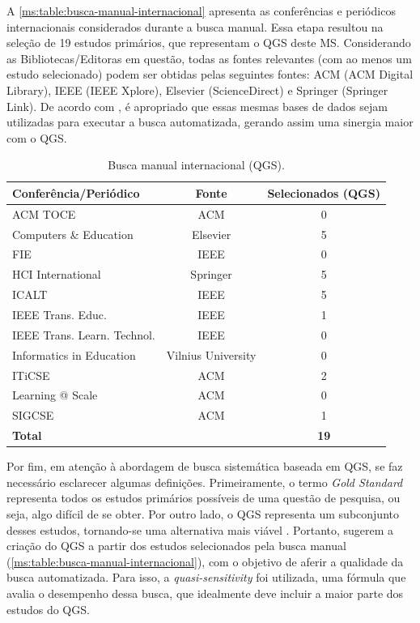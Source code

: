 A \autoref{ms:table:busca-manual-internacional} apresenta as conferências e periódicos internacionais considerados durante a busca manual. Essa etapa resultou na seleção de 19 estudos primários, que representam o QGS deste MS. Considerando as Bibliotecas/Editoras em questão, todas as fontes relevantes (com ao menos um estudo selecionado) podem ser obtidas pelas seguintes fontes: ACM (ACM Digital Library), IEEE (IEEE Xplore), Elsevier (ScienceDirect) e Springer (Springer Link). De acordo com , é apropriado que essas mesmas bases de dados sejam utilizadas para executar a busca automatizada, gerando assim uma sinergia maior com o QGS.

\begin{table}[htbp]
\centering
\caption{Busca manual internacional (QGS).}
\label{ms:table:busca-manual-internacional}
\begin{tabular}{lcc}
\hline
\textbf{Conferência/Periódico} & \textbf{Fonte}     & \textbf{Selecionados (QGS)} \\ \hline
ACM TOCE                       & ACM                & 0            \\ 
Computers \& Education         & Elsevier           & 5            \\ 
FIE                            & IEEE               & 0            \\ 
HCI International              & Springer           & 5            \\ 
ICALT                          & IEEE               & 5            \\ 
IEEE Trans. Educ.              & IEEE               & 1            \\ 
IEEE Trans. Learn. Technol.    & IEEE               & 0            \\ 
Informatics in Education       & Vilnius University & 0            \\ 
ITiCSE                         & ACM                & 2            \\ 
Learning @ Scale               & ACM                & 0            \\ 
SIGCSE                         & ACM                & 1            \\ 
\textbf{Total}                 & \textbf{}          & \textbf{19}  \\ \hline
\end{tabular}
\fautor
\end{table}

Por fim, em atenção à abordagem de busca sistemática baseada em QGS, se faz necessário esclarecer algumas definições. Primeiramente, o termo \textit{Gold Standard} representa todos os estudos primários possíveis de uma questão de pesquisa, ou seja, algo difícil de se obter. Por outro lado, o QGS representa um subconjunto desses estudos, tornando-se uma alternativa mais viável \cite{Zhang2011}. Portanto,  sugerem a criação do QGS a partir dos estudos selecionados pela busca manual (\autoref{ms:table:busca-manual-internacional}), com o objetivo de aferir a qualidade da busca automatizada. Para isso, a \textit{quasi-sensitivity} foi utilizada, uma fórmula que avalia o desempenho dessa busca, que idealmente deve incluir a maior parte dos estudos do QGS. 

